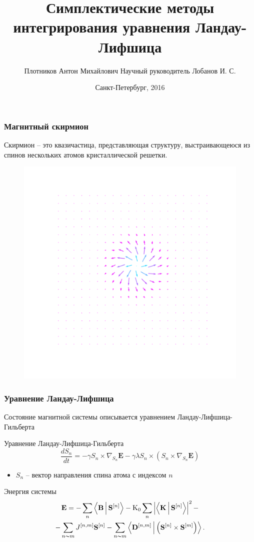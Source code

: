 \documentclass[t]{beamer}
\title[Симплектические методы интегрирования ур-я Ландау-Лифшица]{%
    Симплектические методы интегрирования\linebreak
        уравнения Ландау-Лифшица
}
\author[Плотников Антон]{Плотников Антон Михайлович\linebreak\footnotesize
    Научный руководитель Лобанов И. С.}
\institute{Кафедра высшей математики}
\date{Санкт-Петербург, 2016}
\newcommand*{\Sn}{\ensuremath{\mathbf{S}^{[n]}}}
\begin{document}
\ITMOtitlepage

\begin{frame}
    \frametitle{Магнитный скирмион}
    Скирмион -- это квазичастица, представляющая структуру, выстраивающеюся из
    спинов нескольких атомов кристаллической решетки.
    \pause
    \begin{figure}
        \centering
        \includegraphics[width=0.5\linewidth]{skyrmion4}
    \end{figure}
\end{frame}

\begin{frame}
    \frametitle{Уравнение Ландау-Лифшица}
    Состояние магнитной системы описывается уравнением Ландау-Лифшица-Гильберта

    \begin{block}{Уравнение Ландау-Лифшица-Гильберта}
        \begin{equation*}
            \frac{dS_n}{dt} = -\gamma S_n \times \nabla_{S_n} \mathbf E -
            \gamma\lambda S_n \times
            \left(S_n\times \nabla_{S_n} \mathbf E \right)
        \end{equation*}
    \end{block}

    \begin{itemize}
        \item $S_n$ -- вектор направления спина атома с индексом $n$
    \end{itemize}

    \pause

    \begin{block}{Энергия системы}
        \begin{multline*}
            \mathbf E = -\sum_n \Braket{\mathbf B | \Sn} - \mathrm{K_0} \sum_n
            \left| \Braket{\mathbf K | \Sn } \right|^2
            -\\-
            \sum_{n\thicksim m} J^{[n,m]} \Sn - \sum_{n\thicksim m}
            \Braket{\mathbf D^{[n,m]} | \left(\Sn \times \mathbf S^{[m]}\right)}.
        \end{multline*}
    \end{block}
\end{frame}
\end{document}
